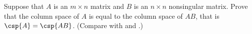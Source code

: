 Suppose that $A$ is an $m\times n$ matrix and $B$ is an $n\times n$ nonsingular matrix.  Prove that the column space of $A$ is equal to the column space of $AB$, that is $\csp{A}=\csp{AB}$.  (Compare with  and .)